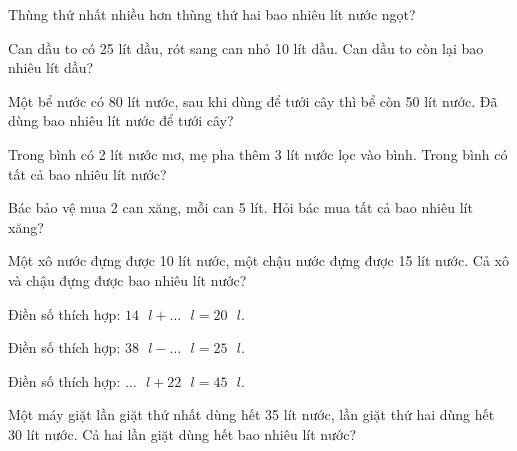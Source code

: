 \begin{ex}
Thùng thứ nhất nhiều hơn thùng thứ hai bao nhiêu lít nước ngọt?
\end{ex}

\begin{ex}
Can dầu to có 25 lít dầu, rót sang can nhỏ 10 lít dầu. Can dầu to còn lại bao nhiêu lít dầu?
\end{ex}

\begin{ex}
Một bể nước có 80 lít nước, sau khi dùng để tưới cây thì bể còn 50 lít nước. Đã dùng bao nhiêu lít nước để tưới cây?
\end{ex}

\begin{ex}
Trong bình có 2 lít nước mơ, mẹ pha thêm 3 lít nước lọc vào bình. Trong bình có tất cả bao nhiêu lít nước?
\end{ex}

\begin{ex}
Bác bảo vệ mua 2 can xăng, mỗi can 5 lít. Hỏi bác mua tất cả bao nhiêu lít xăng?
\end{ex}

\begin{ex}
Một xô nước đựng được 10 lít nước, một chậu nước đựng được 15 lít nước. Cả xô và chậu đựng được bao nhiêu lít nước?
\end{ex}

\begin{ex}
Điền số thích hợp: $14\text{ }l + \dots\text{ }l = 20\text{ }l$.
\end{ex}

\begin{ex}
Điền số thích hợp: $38\text{ }l - \dots\text{ }l = 25\text{ }l$.
\end{ex}

\begin{ex}
Điền số thích hợp: $\dots\text{ }l + 22\text{ }l = 45\text{ }l$.
\end{ex}

\begin{ex}
Một máy giặt lần giặt thứ nhất dùng hết 35 lít nước, lần giặt thứ hai dùng hết 30 lít nước. Cả hai lần giặt dùng hết bao nhiêu lít nước?
\end{ex}

